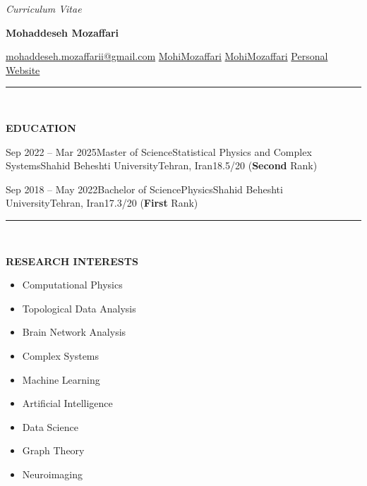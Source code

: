 \documentclass[12pt, b4paper]{cv}
\begin{document}
\begin{center}
	\textit{Curriculum Vitae}\\
	{\Huge \textbf{Mohaddeseh Mozaffari}\par}

	\href{mailto:mohaddeseh.mozaffarii@gmail.com}{ mohaddeseh.mozaffarii@gmail.com}
	\hspace{5pt} 
	\href{https://www.linkedin.com/in/MohiMozaffari/}{ MohiMozaffari}
	\hspace{5pt} 
	\href{https://github.com/MohiMozaffari}{ MohiMozaffari}
	\hspace{5pt} 
	\href{https://mohimozaffari.github.io/}{ Personal Website} 
\end{center}


\vspace{-0.15in}
\rule{\textwidth}{1pt}\\
\vspace{-0.15in}


{\Large \textbf{EDUCATION}}
\vspace{0.1in}

\begin{education}{Sep 2022 -- Mar 2025}{Master of Science}{Statistical Physics and Complex Systems}{Shahid Beheshti University}{Tehran, Iran}{18.5/20 (\textbf{Second} Rank)}%
\end{education}

\begin{education}{Sep 2018 -- May 2022}{Bachelor of Science}{Physics}{Shahid Beheshti University}{Tehran, Iran}{17.3/20 (\textbf{First} Rank)}
\end{education}


\vspace{-0.15in}
\rule{\textwidth}{1pt}\\
\vspace{-0.15in}


{\Large \textbf{RESEARCH INTERESTS}}

\vspace{-5pt}
\begin{multicols}{3}
	\begin{itemize}
		\setlength\itemsep{-1pt}
				\item Computational Physics
				\item Topological Data Analysis
				\item Brain Network Analysis
				\item Complex Systems
				\item Machine Learning
				\item Artificial Intelligence
				\item Data Science
				\item Graph Theory
				\item Neuroimaging
	\end{itemize}
\end{multicols}
\end{document}
